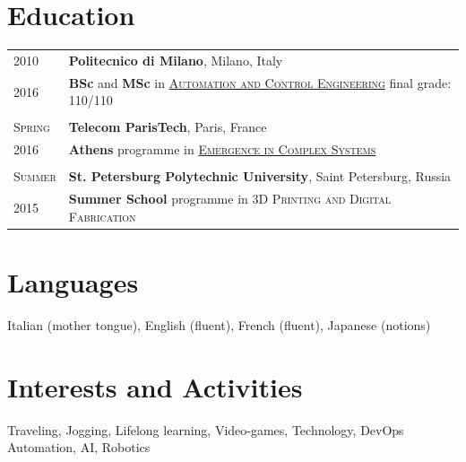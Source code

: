 \documentclass[a4paper,10pt]{article}
\begin{document}
   \section{Education}
      \begin{tabular}{p{1.7cm}|p{15.5cm}}
         \centering\textsc{2010} & \textbf{Politecnico di Milano}, Milano, Italy\\
         \centering\textsc{2016} & \textbf{BSc} and \textbf{MSc} in \textsc{\href{http://www.polinternational.polimi.it/educational-offer/laurea-magistrale-equivalent-to-master-of-science-programmes/automation-and-control-engineering/}{Automation and Control Engineering}} \hfill final grade: \textsc{110/110} \\ 
         
         \multicolumn{2}{c}{} \\
         \centering\textsc{Spring} & \textbf{Telecom ParisTech}, Paris, France\\
         \centering\textsc{2016}   & \textbf{Athens} programme in \textsc{\href{http://www.athensprogramme.com/catalog/show/1640}{Emergence in Complex Systems}}\\
         
         \multicolumn{2}{c}{} \\
         \centering\textsc{Summer} & \textbf{St. Petersburg Polytechnic University}, Saint Petersburg, Russia\\
         \centering\textsc{2015}   & \textbf{Summer School} programme in \textsc{3D Printing and Digital Fabrication}\\
      \end{tabular}

   \section{Languages}
   Italian (mother tongue), English (fluent), French (fluent), Japanese (notions)

   \section{Interests and Activities}
   Traveling, Jogging, Lifelong learning, Video-games, Technology, DevOps Automation, AI, Robotics
\end{document}
